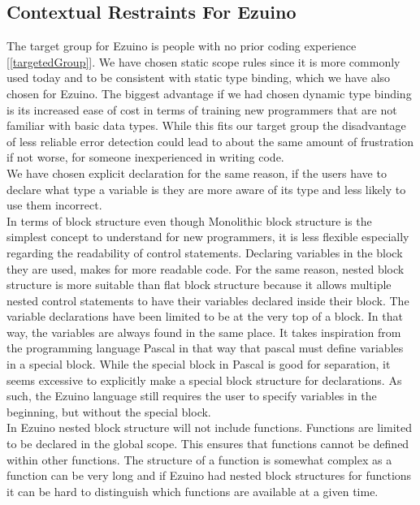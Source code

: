 \subsection{Contextual Restraints For Ezuino}
The target group for Ezuino is people with no prior coding experience [\ref{targetedGroup}]. We have chosen static scope rules since it is more commonly used today and to be consistent with static type binding, which we have also chosen for Ezuino. The biggest advantage if we had chosen dynamic type binding is its increased ease of cost in terms of training new programmers that are not familiar with basic data types. While this fits our target group the disadvantage of less reliable error detection could lead to about the same amount of frustration if not worse, for someone inexperienced in writing code.\\
We have chosen explicit declaration for the same reason, if the users have to declare what type a variable is they are more aware of its type and less likely to use them incorrect. \\
In terms of block structure even though Monolithic block structure is the simplest concept to understand for new programmers, it is less flexible especially regarding the readability of control statements. Declaring variables in the block they are used, makes for more readable code. For the same reason, nested block structure is more suitable than flat block structure because it allows multiple nested control statements to have their variables declared inside their block.
The variable declarations have been limited to be at the very top of a block. In that way, the variables are always found in the same place. It takes inspiration from the programming language Pascal in that way that pascal must define variables in a special block. While the special block in Pascal is good for separation, it seems excessive to explicitly make a special block structure for declarations. As such, the Ezuino language still requires the user to specify variables in the beginning, but without the special block. \\
In Ezuino nested block structure will not include functions. Functions are limited to be declared in the global scope. This ensures that functions cannot be defined within other functions. The structure of a function is somewhat complex as a function can be very long and if Ezuino had nested block structures for functions it can be hard to distinguish which functions are available at a given time.
